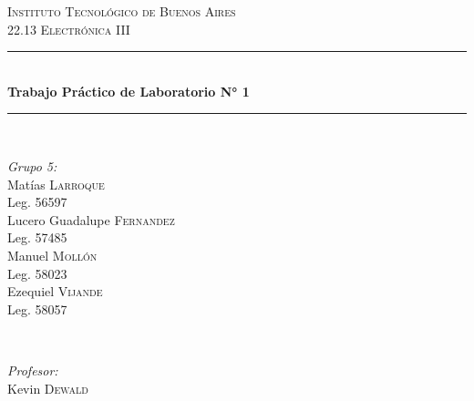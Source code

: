 \begin{titlepage}
    
\newcommand{\HRule}{\rule{\linewidth}{0.5mm}} %
    
\center %
     
    
\textsc{\LARGE Instituto Tecnológico de Buenos Aires}\\[2cm] %
\textsc{\Large 22.13 Electrónica III}\\[1.5cm] %
    
    
\HRule \\[0.5cm]
{ \huge \bfseries Trabajo Práctico de Laboratorio N° 1}\\[0.4cm] %
\HRule \\[2cm]
     
    
\begin{minipage}{0.4\textwidth}
\begin{flushleft} \large
\emph{Grupo 5:}\\		%
[.3cm]
Matías \textsc{Larroque}\\
Leg. 56597\\ 
[.3cm]
Lucero Guadalupe \textsc{Fernandez}\\
Leg. 57485\\ 
[.3cm]
Manuel \textsc{Mollón}\\
Leg. 58023\\ 
[.3cm]
Ezequiel \textsc{Vijande}\\
Leg. 58057\\ 
[.3cm]
\end{flushleft}
\end{minipage}
~
\begin{minipage}{0.4\textwidth}
\begin{flushright} \large
\emph{Profesor:} \\
[.3cm]
Kevin \textsc{Dewald} %
\end{flushright}
\end{minipage}\\[2cm]
    

\end{titlepage}
